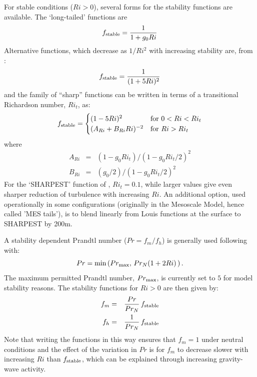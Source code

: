 \documentclass{UMDP_article}
\begin{document}
For stable conditions ($Ri > 0$), several forms for the stability 
functions are available.  The `long-tailed' functions are
\begin{equation*}
  f_{\rm stable} = \frac{1}{1+g_0 Ri}
\end{equation*}
Alternative functions, which decrease as $1/Ri^2$ with increasing
stability are, from \cite{louis1979}:
\begin{equation*}
  f_{\rm stable} = \frac{1}{(1+ 5 Ri)^2}
\end{equation*}
and the family of ``sharp'' functions can be written in terms of a transitional 
Richardson number, $Ri_{t}$, as:
\begin{equation*}
  f_{\rm stable} = 
\begin{cases}
  (1 - 5Ri)^2 & {\rm for}\ 0<Ri<Ri_{t} \\
  (A_{Ri} + B_{Ri} Ri)^{-2} & {\rm for}\ Ri>Ri_{t}
\end{cases}
\end{equation*}
where 
\begin{eqnarray}
A_{Ri} & = & \left(1-g_0 Ri_{t}\right)/\left(1- g_0 Ri_{t}/2\right)^2  \nonumber\\
B_{Ri} & = & (g_0/2) /\left(1 - g_0 Ri_{t}/2\right)^2
\end{eqnarray}
For the `SHARPEST' function of \cite{derbyshire1997}, $Ri_{t}=0.1$, while 
larger values give even sharper reduction of turbulence with increasing $Ri$.
An additional option, used operationally in some configurations (originally 
in the Mesoscale Model, hence called 'MES tails'), is to blend linearly 
from Louis functions at the surface to SHARPEST by 200m.  

A stability dependent Prandtl number ($Pr=f_m/f_h$) is generally used 
following \cite{MailhotLock2004} with:
\begin{equation*}
  Pr=\min \left( Pr_{\rm max}, \, Pr_N(1+2Ri) \, \right).
\end{equation*}
The maximum permitted Prandtl number, $Pr_{\rm max}$, is currently set
to $5$ for model stability reasons. The stability functions for $Ri>0$ are 
then given by:
\begin{eqnarray*}
  f_m & =& \frac{Pr}{Pr_N} \, f_{\rm stable} \\
  f_h & =& \frac{1}{Pr_N}  \, f_{\rm stable} 
\end{eqnarray*}
Note that writing the functions in this way ensures that $f_m=1$ under 
neutral conditions and the effect of the variation in $Pr$ is for $f_m$ 
to decrease slower with increasing $Ri$ than $f_{\rm stable}$, which can 
be explained through increasing gravity-wave activity.
\end{document}
